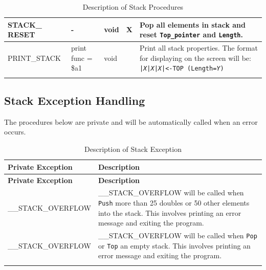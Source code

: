 \begin{longtable}{|m{3cm}|m{3cm}|m{2cm}|m{1cm}|m{5.1cm}|}
        \hline
            STACK\_ RESET&
            \centering -&
            void&
            \centering X&
            Pop all elements in stack and reset \texttt{Top\_pointer} and \texttt{Length}.\\
        \hline
            PRINT\_STACK& 
            print func = \$a1 \newline [\ref{sec:3.Print function}]&
            void&
            &
            Print all stack properties. The format for displaying on the screen will be: \newline \texttt{|\textit{X}|\textit{X}|\textit{X}|<-TOP (Length=\textit{Y})}\\
        \hline
        \caption{Description of Stack Procedures}\\
    \end{longtable}

    \subsection{Stack Exception Handling}
        The procedures below are private and will be automatically called when an error occurs.
    
        \begin{longtable}{|m{7.5cm}|m{7.5cm}|}
            \hline
                \textbf{Private Exception} & 
                \textbf{Description}\\
            \hline
            \endfirsthead
            \hline
                \textbf{Private Exception} & 
                \textbf{Description}\\
            \hline
            \endhead
                \_\_STACK\_OVERFLOW& 
                \_\_STACK\_OVERFLOW will be called when \texttt{Push} more than 25 doubles or 50 other elements into the stack. This involves printing an error message and exiting the program.\\
            \hline
                \_\_STACK\_OVERFLOW&
                \_\_STACK\_OVERFLOW will be called when \texttt{Pop} or \texttt{Top} an empty stack. This involves printing an error message and exiting the program.\\
            \hline
            \caption{Description of Stack Exception}\\
        \end{longtable}